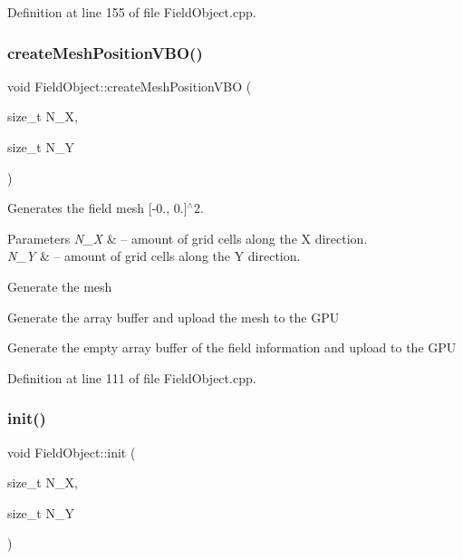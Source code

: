 Definition at line 155 of file Field\+Object.\+cpp.

\mbox{\label{class_field_object_a059a05b427c9231642913aee67768613}} 
\subsubsection{\texorpdfstring{create\+Mesh\+Position\+V\+B\+O()}{createMeshPositionVBO()}}
{\footnotesize\ttfamily void Field\+Object\+::create\+Mesh\+Position\+V\+BO (\begin{DoxyParamCaption}\item[{size\+\_\+t}]{N\+\_\+X,  }\item[{size\+\_\+t}]{N\+\_\+Y }\end{DoxyParamCaption})\hspace{0.3cm}{\ttfamily [protected]}}



Generates the field mesh \mbox{[}-\/0., 0.\mbox{]}$^\wedge$2. 


\begin{DoxyParams}{Parameters}
{\em N\+\_\+X} & -- amount of grid cells along the X direction. \\
\hline
{\em N\+\_\+Y} & -- amount of grid cells along the Y direction. \\
\hline
\end{DoxyParams}
Generate the mesh

Generate the array buffer and upload the mesh to the G\+PU

Generate the empty array buffer of the field information and upload to the G\+PU 

Definition at line 111 of file Field\+Object.\+cpp.

\mbox{\label{class_field_object_a92a55f8d93bc37fd81d4b157b43fc1f6}} 
\subsubsection{\texorpdfstring{init()}{init()}}
{\footnotesize\ttfamily void Field\+Object\+::init (\begin{DoxyParamCaption}\item[{size\+\_\+t}]{N\+\_\+X,  }\item[{size\+\_\+t}]{N\+\_\+Y }\end{DoxyParamCaption})}



